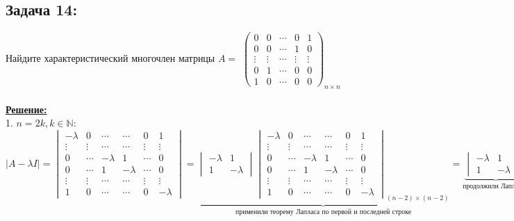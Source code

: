 \documentclass[a4paper,12pt,titlepage,final]{article}
\begin{document}
\subsection*{Задача 14:}
\noindent Найдите характеристический многочлен матрицы $A = $
$\begin{pmatrix}
    0 & 0 & \cdots & 0 & 1 \\
    0 & 0 & \cdots & 1 & 0 \\
    \vdots & \vdots & \cdots & \vdots & \vdots \\
    0 & 1 & \cdots & 0 & 0 \\
    1 & 0 & \cdots & 0 & 0
\end{pmatrix}_{n \times n}$ \\ \\
\textbf{\underline{Решение:}} \\
1. $n = 2k, k \in \mathbb{N}$: \\
$|A - \lambda I| = 
\begin{vmatrix}
    -\lambda & 0 & \cdots & \cdots & 0 & 1 \\
    \vdots & \vdots & \cdots & \cdots & \vdots & \vdots \\ 
    0 & \cdots & -\lambda & 1 & \cdots & 0 \\
    0 & \cdots & 1 & -\lambda & \cdots & 0 \\
    \vdots & \vdots & \cdots & \cdots & \vdots & \vdots \\ 
    1 & 0 & \cdots & \cdots & 0 & -\lambda
\end{vmatrix} = 
\underbrace{\begin{vmatrix}
    -\lambda & 1 \\
    1 & -\lambda
\end{vmatrix}
\begin{vmatrix}
    -\lambda & 0 & \cdots & \cdots & 0 & 1 \\
    \vdots & \vdots & \cdots & \cdots & \vdots & \vdots \\ 
    0 & \cdots & -\lambda & 1 & \cdots & 0 \\
    0 & \cdots & 1 & -\lambda & \cdots & 0 \\
    \vdots & \vdots & \cdots & \cdots & \vdots & \vdots \\ 
    1 & 0 & \cdots & \cdots & 0 & -\lambda
\end{vmatrix}_{(n - 2) \times (n - 2)}}_{\text{применили теорему Лапласа по первой и последней строке}} = 
\underbrace{\begin{vmatrix}
    -\lambda & 1 \\
    1 & -\lambda
\end{vmatrix}^{\frac{n}{2}}}_{\text{продолжили Лапласом}} = (\lambda - 1)^{\frac{n}{2}}(\lambda + 1)^{\frac{n}{2}}$ \\ \\ \\
\end{document}
